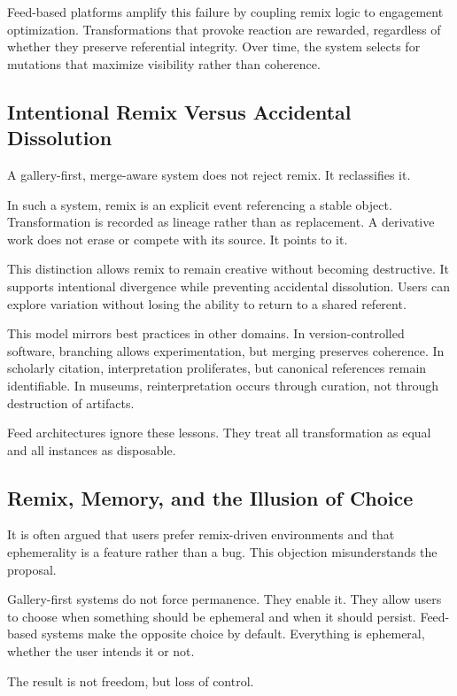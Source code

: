 \documentclass[11pt,oneside]{article}
\begin{document}
Feed-based platforms amplify this failure by coupling remix logic to engagement optimization. Transformations that provoke reaction are rewarded, regardless of whether they preserve referential integrity. Over time, the system selects for mutations that maximize visibility rather than coherence.

\subsection{Intentional Remix Versus Accidental Dissolution}

A gallery-first, merge-aware system does not reject remix. It reclassifies it.

In such a system, remix is an explicit event referencing a stable object. Transformation is recorded as lineage rather than as replacement. A derivative work does not erase or compete with its source. It points to it.

This distinction allows remix to remain creative without becoming destructive. It supports intentional divergence while preventing accidental dissolution. Users can explore variation without losing the ability to return to a shared referent.

This model mirrors best practices in other domains. In version-controlled software, branching allows experimentation, but merging preserves coherence. In scholarly citation, interpretation proliferates, but canonical references remain identifiable. In museums, reinterpretation occurs through curation, not through destruction of artifacts.

Feed architectures ignore these lessons. They treat all transformation as equal and all instances as disposable.

\subsection{Remix, Memory, and the Illusion of Choice}

It is often argued that users prefer remix-driven environments and that ephemerality is a feature rather than a bug. This objection misunderstands the proposal.

Gallery-first systems do not force permanence. They enable it. They allow users to choose when something should be ephemeral and when it should persist. Feed-based systems make the opposite choice by default. Everything is ephemeral, whether the user intends it or not.

The result is not freedom, but loss of control.
\end{document}
